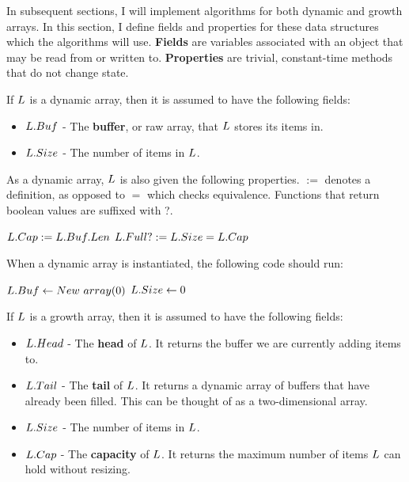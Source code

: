 In subsequent sections, I will implement algorithms for both dynamic and growth arrays. In this section, I define fields and properties for these data structures which the algorithms will use. \textbf{Fields} are variables associated with an object that may be read from or written to. \textbf{Properties} are trivial, constant-time methods that do not change state.

If $\VarList$ is a dynamic array, then it is assumed to have the following fields:

\begin{itemize}
	\item $L.Buf$ - The \textbf{buffer}, or raw array, that $\VarList$ stores its items in.
	\item $L.Size$ - The number of items in $\VarList$.
\end{itemize}

As a dynamic array, $\VarList$ is also given the following properties. $:=$ denotes a definition, as opposed to $=$ which checks equivalence. Functions that return boolean values are suffixed with ?.

\begin{algorithm}
	\begin{algorithmic}
		\State $L.Cap := L.Buf.Len$
		\State
		\State $L.Full? := L.Size = L.Cap$
	\end{algorithmic}
\end{algorithm}

When a dynamic array is instantiated, the following code should run:

\begin{algorithm}
	\begin{algorithmic}
		\Procedure{$\FuncConstructor$}{$\VarList$}
			\State $L.Buf \gets New\ array(0)$
			\State $L.Size \gets 0$
		\EndProcedure
	\end{algorithmic}
\end{algorithm}

If $\VarList$ is a growth array, then it is assumed to have the following fields:

\begin{itemize}
	\item $L.Head$ - The \textbf{head} of $\VarList$. It returns the buffer we are currently adding items to.
	\item $L.Tail$ - The \textbf{tail} of $\VarList$. It returns a dynamic array of buffers that have already been filled. This can be thought of as a two-dimensional array.
	\item $L.Size$ - The number of items in $\VarList$.
	\item $L.Cap$ - The \textbf{capacity} of $\VarList$. It returns the maximum number of items $\VarList$ can hold without resizing.
\end{itemize}

